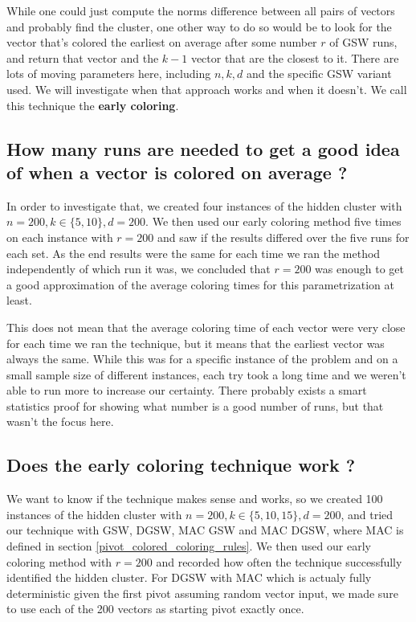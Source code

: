 \documentclass[12pt]{article}
\begin{document}
While one could just compute the norms difference between all pairs of vectors and probably find the cluster, one other way to do so would be to look for the vector that's colored the earliest on average after some number $r$ of GSW runs, and return that vector and the $k-1$ vector that are the closest to it. There are lots of moving parameters here, including $n,k,d$ and the specific GSW variant used. We will investigate when that approach works and when it doesn't. We call this technique the \textbf{early coloring}.

\subsection{How many runs are needed to get a good idea of when a vector is colored on average ?}
In order to investigate that, we created four instances of the hidden cluster with $n=200,k\in\{5,10\},d=200$. We then used our early coloring method five times on each instance with $r=200$ and saw if the results differed over the five runs for each set. As the end results were the same for each time we ran the method independently of which run it was, we concluded that $r=200$ was enough to get a good approximation of the average coloring times for this parametrization at least.

This does not mean that the average coloring time of each vector were very close for each time we ran the technique, but it means that the earliest vector was always the same. While this was for a specific instance of the problem and on a small sample size of different instances, each try took a long time and we weren't able to run more to increase our certainty. There probably exists a smart statistics proof for showing what number is a good number of runs, but that wasn't the focus here.

\subsection{Does the early coloring technique work ?}\label{early_work}
We want to know if the technique makes sense and works, so we created 100 instances of the hidden cluster with $n=200,k\in\{5,10,15\},d=200$, and tried our technique with GSW, DGSW, MAC GSW and MAC DGSW, where MAC is defined in section \ref{pivot_colored_coloring_rules}. We then used our early coloring method with $r=200$ and recorded how often the technique successfully identified the hidden cluster. For DGSW with MAC which is actualy fully deterministic given the first pivot assuming random vector input, we made sure to use each of the 200 vectors as starting pivot exactly once.
\end{document}
